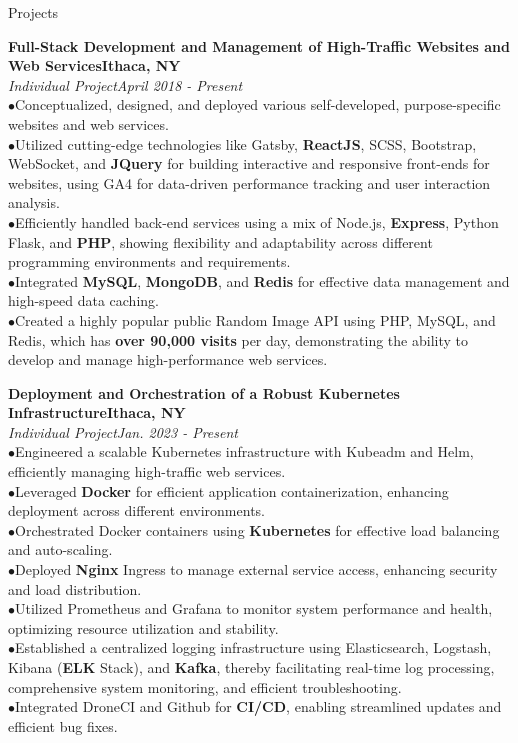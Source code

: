 \documentclass{resume} %
\begin{document}
\begin{rSection}{Projects}

{\bf Full-Stack Development and Management of High-Traffic Websites and Web Services}\hfill{\textbf{Ithaca, NY}}
\\{\em Individual Project}\hfill {\em April 2018 - Present}
\\ $ \bullet $Conceptualized, designed, and deployed various self-developed, purpose-specific websites and web services.
\\ $ \bullet $Utilized cutting-edge technologies like Gatsby, \textbf{ReactJS}, SCSS, Bootstrap, WebSocket, and \textbf{JQuery} for building interactive and responsive front-ends for websites, using GA4 for data-driven performance tracking and user interaction analysis.
\\ $ \bullet $Efficiently handled back-end services using a mix of Node.js, \textbf{Express}, Python Flask, and \textbf{PHP}, showing flexibility and adaptability across different programming environments and requirements.
\\ $ \bullet $Integrated \textbf{MySQL}, \textbf{MongoDB}, and \textbf{Redis} for effective data management and high-speed data caching.
\\ $ \bullet $Created a highly popular public Random Image API using PHP, MySQL, and Redis, which has \textbf{over 90,000 visits} per day, demonstrating the ability to develop and manage high-performance web services.

{\bf Deployment and Orchestration of a Robust Kubernetes Infrastructure}\hfill{\textbf{Ithaca, NY}}
\\{\em Individual Project}\hfill {\em Jan. 2023 - Present}
\\ $ \bullet $Engineered a scalable Kubernetes infrastructure with Kubeadm and Helm, efficiently managing high-traffic web services.
\\ $ \bullet $Leveraged \textbf{Docker} for efficient application containerization, enhancing deployment across different environments.
\\ $ \bullet $Orchestrated Docker containers using \textbf{Kubernetes} for effective load balancing and auto-scaling.
\\ $ \bullet $Deployed \textbf{Nginx} Ingress to manage external service access, enhancing security and load distribution.
\\ $ \bullet $Utilized Prometheus and Grafana to monitor system performance and health, optimizing resource utilization and stability.
\\ $ \bullet $Established a centralized logging infrastructure using Elasticsearch, Logstash, Kibana (\textbf{ELK} Stack), and \textbf{Kafka}, thereby facilitating real-time log processing, comprehensive system monitoring, and efficient troubleshooting.
\\ $ \bullet $Integrated DroneCI and Github for \textbf{CI/CD}, enabling streamlined updates and efficient bug fixes.



\end{rSection}
\end{document}

